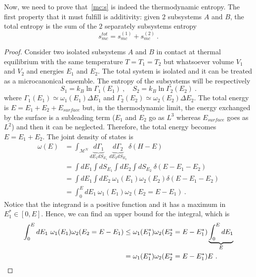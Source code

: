     Now, we need to prove that~\eqref{mc:s} is indeed the thermodynamic entropy. The first property that it must fulfill is additivity: given $2$ subsystems $A$ and $B$, the total entropy is the sum of the $2$ separately subsystems entropy
    \begin{equation*}
        s_{mc}^{tot} = s_{mc}^{(1)} + s_{mc}^{(2)} ~.
    \end{equation*}
    \begin{proof}
        Consider two isolated subsystems $A$ and $B$ in contact at thermal equilibrium with the same temperature $T = T_1 = T_2$ but whatsoever volume $V_1$ and $V_2$ and energies $E_1$ and $E_2$. The total system is isolated and it can be treated as a microcanonical ensemble. The entropy of the subsystems will be respectively 
        \begin{equation*}
            S_1 = k_B \ln \Gamma_1(E_1) ~, \quad S_2 = k_B \ln \Gamma_2 (E_2) ~.
        \end{equation*}
        where $\Gamma_1 (E_1) \simeq \omega_1 (E_1) \Delta E_1$ and $\Gamma_2 (E_2) \simeq \omega_2 (E_2) \Delta E_2$. The total energy is $E = E_1 + E_2 + E_{surface}$ but, in the thermodynamic limit, the energy exchanged by the surface is a subleading term ($E_1$ and $E_2$ go as $L^3$ whereas $E_{surface}$ goes as $L^2$) and then it can be neglected. Therefore, the total energy becomes $E = E_1 + E_2$. The joint density of states is 
        \begin{equation*}
        \begin{aligned}
            \omega(E) & = \int_{\mathcal M^N} \underbrace{d\Gamma_1}_{dE_1 dS_{E_1}} ~ \underbrace{d\Gamma_2}_{dE_2 dS_{E_2}} ~ \delta(H - E) \\ & = \int dE_1 \int dS_{E_1} \int dE_2 \int dS_{E_2} ~ \delta (E - E_1 - E_2) \\ & = \int dE_1 \int dE_2 ~ \omega_1(E_1) \omega_2(E_2) \delta (E - E_1 - E_2) \\ & = \int_0^E dE_1 ~ \omega_1(E_1) \omega_2(E_2 = E - E_1) ~.
        \end{aligned}
        \end{equation*}
        Notice that the integrand is a positive function and it has a maximum in $E^*_1 \in [0, E]$. Hence, we can find an upper bound for the integral, which is
        \begin{equation}\label{proof1}
        \begin{aligned}
            \integ{0}{E}{E_1} \omega_1(E_1) \omega_2(E_2 = E - E_1) & \leq \omega_1(E^*_1) \omega_2(E^*_2 = E - E^*_1) \underbrace{\int_0^E dE_1}_E \\ & = \omega_1(E^*_1) \omega_2(E^*_2 = E - E^*_1) E ~.

\end{aligned}
\end{equation}
\end{proof}
